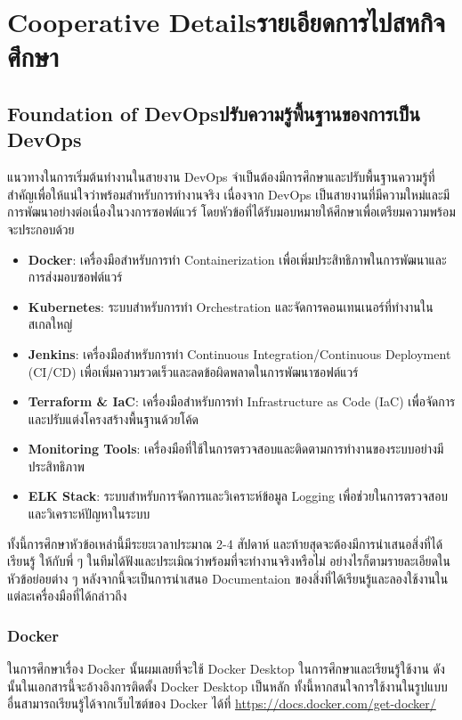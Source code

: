 \setcounter{secnumdepth}{3}

\chapter{\ifenglish Cooperative Details\else รายเอียดการไปสหกิจศึกษา\fi}


\section{\ifenglish Foundation of DevOps\else ปรับความรู้พื้นฐานของการเป็น DevOps\fi}
แนวทางในการเริ่มต้นทำงานในสายงาน DevOps จำเป็นต้องมีการศึกษาและปรับพื้นฐานความรู้ที่สำคัญเพื่อให้แน่ใจว่าพร้อมสำหรับการทำงานจริง
เนื่องจาก DevOps เป็นสายงานที่มีความใหม่และมีการพัฒนาอย่างต่อเนื่องในวงการซอฟต์แวร์ โดยหัวข้อที่ได้รับมอบหมายให้ศึกษาเพื่อเตรียมความพร้อมจะประกอบด้วย

\begin{itemize}
    \item \textbf{Docker}: เครื่องมือสำหรับการทำ Containerization เพื่อเพิ่มประสิทธิภาพในการพัฒนาและการส่งมอบซอฟต์แวร์
    \item \textbf{Kubernetes}: ระบบสำหรับการทำ Orchestration และจัดการคอนเทนเนอร์ที่ทำงานในสเกลใหญ่
    \item \textbf{Jenkins}: เครื่องมือสำหรับการทำ Continuous Integration/Continuous Deployment (CI/CD) เพื่อเพิ่มความรวดเร็วและลดข้อผิดพลาดในการพัฒนาซอฟต์แวร์
    \item \textbf{Terraform \& IaC}: เครื่องมือสำหรับการทำ Infrastructure as Code (IaC) เพื่อจัดการและปรับแต่งโครงสร้างพื้นฐานด้วยโค้ด
    \item \textbf{Monitoring Tools}: เครื่องมือที่ใช้ในการตรวจสอบและติดตามการทำงานของระบบอย่างมีประสิทธิภาพ
    \item \textbf{ELK Stack}: ระบบสำหรับการจัดการและวิเคราะห์ข้อมูล Logging เพื่อช่วยในการตรวจสอบและวิเคราะห์ปัญหาในระบบ
\end{itemize}

ทั้งนี้การศึกษาหัวข้อเหล่านี้มีระยะเวลาประมาณ 2-4 สัปดาห์ และท้ายสุดจะต้องมีการนำเสนอสิ่งที่ได้เรียนรู้
ให้กับพี่ ๆ ในทีมได้ฟังและประเมิณว่าพร้อมที่จะทำงานจริงหรือไม่ อย่างไรก็ตามรายละเอียดในหัวข้อย่อยต่าง ๆ หลังจากนี้จะเป็นการนำเสนอ Documentaion ของสิ่งที่ได้เรียนรู้และลองใช้งานในแต่ละเครื่องมือที่ได้กล่าวถึง

\subsection{Docker}
ในการศึกษาเรื่อง Docker \cite{docker} นั้นผมเลยที่จะใช้ Docker Desktop ในการศึกษาและเรียนรู้ใช้งาน
ดังนั้นในเอกสารนี้จะอ้างอิงการติดตั้ง Docker Desktop เป็นหลัก ทั้งนี้หากสนใจการใช้งานในรูปแบบอื่นสามารถเรียนรู้ได้จากเว็บไซต์ของ Docker ได้ที่ \url{https://docs.docker.com/get-docker/}

